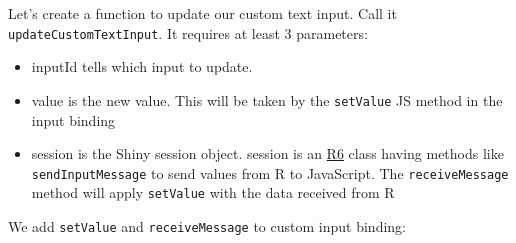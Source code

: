 \documentclass[]{book}
\newenvironment{Shaded}{\begin{snugshade}}{\end{snugshade}}
\newcommand{\ControlFlowTok}[1]{\textcolor[rgb]{0.13,0.29,0.53}{\textbf{#1}}}
\newcommand{\DataTypeTok}[1]{\textcolor[rgb]{0.13,0.29,0.53}{#1}}
\newcommand{\KeywordTok}[1]{\textcolor[rgb]{0.13,0.29,0.53}{\textbf{#1}}}
\newcommand{\NormalTok}[1]{#1}
\newcommand{\OperatorTok}[1]{\textcolor[rgb]{0.81,0.36,0.00}{\textbf{#1}}}
\newcommand{\OtherTok}[1]{\textcolor[rgb]{0.56,0.35,0.01}{#1}}
\newcommand{\StringTok}[1]{\textcolor[rgb]{0.31,0.60,0.02}{#1}}
\providecommand{\tightlist}{%
  \setlength{\itemsep}{0pt}\setlength{\parskip}{0pt}}
\begin{document}
Let's create a function to update our custom text input. Call it \texttt{updateCustomTextInput}. It requires at least 3 parameters:

\begin{itemize}
\tightlist
\item
  inputId tells which input to update.
\item
  value is the new value. This will be taken by the \texttt{setValue} JS method in the input binding
\item
  session is the Shiny session object. session is an \href{https://r6.r-lib.org}{R6} class having methods like \texttt{sendInputMessage} to send values from R to JavaScript. The \texttt{receiveMessage} method will apply \texttt{setValue} with the data received from R
\end{itemize}

\begin{Shaded}
\end{Shaded}

We add \texttt{setValue} and \texttt{receiveMessage} to custom input binding:
\end{document}
